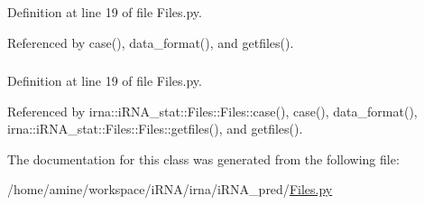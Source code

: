 \hypertarget{classirna_1_1iRNA__pred_1_1Files_1_1Files_a001186dfa6b722ed98a7be15da6d5cc0}{
\subsubsection[{predict}]{}}
\label{classirna_1_1iRNA__pred_1_1Files_1_1Files_a001186dfa6b722ed98a7be15da6d5cc0}


\-Definition at line 19 of file \-Files.\-py.



\-Referenced by case(), data\-\_\-format(), and getfiles().

\hypertarget{classirna_1_1iRNA__pred_1_1Files_1_1Files_a547f44c9ec1bd847e9b744c5859e41c2}{
\subsubsection[{random}]{}}
\label{classirna_1_1iRNA__pred_1_1Files_1_1Files_a547f44c9ec1bd847e9b744c5859e41c2}


\-Definition at line 19 of file \-Files.\-py.



\-Referenced by irna\-::i\-R\-N\-A\-\_\-stat\-::\-Files\-::\-Files\-::case(), case(), data\-\_\-format(), irna\-::i\-R\-N\-A\-\_\-stat\-::\-Files\-::\-Files\-::getfiles(), and getfiles().



\-The documentation for this class was generated from the following file\-:\begin{DoxyCompactItemize}
\item 
/home/amine/workspace/i\-R\-N\-A/irna/i\-R\-N\-A\-\_\-pred/\hyperlink{iRNA__pred_2Files_8py}{\-Files.\-py}\end{DoxyCompactItemize}
